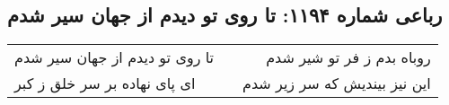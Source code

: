 \begin{center}
\section*{رباعی شماره ۱۱۹۴: تا روی تو دیدم از جهان سیر شدم}
\label{sec:1194}
\begin{longtable}{l p{0.5cm} r}
تا روی تو دیدم از جهان سیر شدم
&&
روباه بدم ز فر تو شیر شدم
\\
ای پای نهاده بر سر خلق ز کبر
&&
این نیز بیندیش که سر زیر شدم
\\
\end{longtable}
\end{center}
